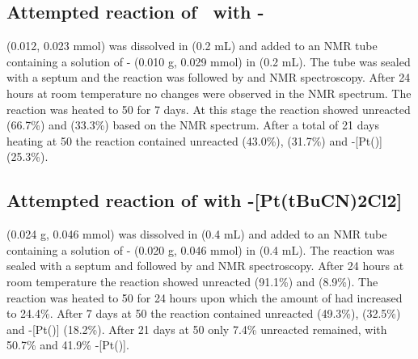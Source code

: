 \subsection*{Attempted reaction of \tButhixantphos\ with \trans-}
\tButhixantphos{} (0.012, 0.023 mmol) was dissolved in  (0.2 mL) and added to an NMR tube containing a solution of \trans- (0.010 g, 0.029 mmol) in  (0.2 mL). The tube was sealed with a septum and the reaction was followed by \proton{} and \phosphorus{} NMR spectroscopy.  After 24 hours at room temperature no changes were observed in the NMR spectrum.  The reaction was heated to 50 \degC for 7 days.  At this stage the reaction showed unreacted \tButhixantphos{} (66.7\%) and \tButhixantphos{} (33.3\%) based on the \phosphorus{} NMR spectrum.  After a total of 21 days heating at 50 \degC the reaction contained unreacted \tButhixantphos{} (43.0\%), \tButhixantphos{} (31.7\%) and \trans-[Pt(\tButhixantphos)] (25.3\%).  

\subsection*{Attempted reaction of \tButhixantphos with \trans-[Pt(tBuCN)2Cl2]}
\tButhixantphos{} (0.024 g, 0.046 mmol) was dissolved in  (0.4 mL) and added to an NMR tube containing a solution of \trans- (0.020 g, 0.046 mmol) in  (0.4 mL).  The reaction was sealed with a septum and followed by \proton{} and \phosphorus{} NMR spectroscopy.  After 24 hours at room temperature the reaction showed unreacted \tButhixantphos{} (91.1\%) and \tButhixantphos{} (8.9\%).  The reaction was heated to 50 \degC{} for 24 hours upon which the amount of \tButhixantphos{} had increased to 24.4\%.  After 7 days at 50 \degC the reaction contained unreacted \tButhixantphos{} (49.3\%), \tButhixantphos{} (32.5\%) and \trans-[Pt(\tButhixantphos)] (18.2\%).  After 21 days at 50 \degC only 7.4\% unreacted \tButhixantphos remained, with 50.7\% \tButhixantphos{} and 41.9\% \trans-[Pt(\tButhixantphos)].  

